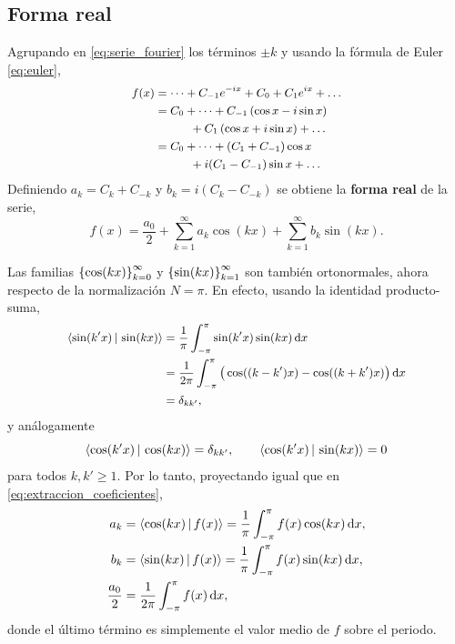 \subsection{Forma real}
\label{subsec:fourier_real}

Agrupando en \eqref{eq:serie_fourier} los t\'erminos $\pm k$ y usando la
f\'ormula de Euler \eqref{eq:euler},
\begin{equation}
  \label{eq:fourier_real_desarrollo}
  \small
  \begin{aligned}
    f(x)&=\dots+C_{-1}e^{-ix}+C_0+C_1e^{ix}+\dots\\
        &=C_0+\dots+C_{-1}\left( \cos x-i\sin x \right)\\
        &\qquad\quad+C_{1}\left( \cos x+i\sin x \right)+\dots\\
        &=C_0+\dots+(C_{1}+C_{-1})\cos x\\
        &\qquad\quad+i(C_{1}-C_{-1})\sin x+\dots
  \end{aligned}
\end{equation}
Definiendo $a_k=C_k+C_{-k}$ y $b_k=i(C_k-C_{-k})$ se obtiene la
\textbf{forma real} de la serie,
\begin{equation}
  \label{eq:fourier_real}
  f(x)=\frac{a_0}{2}+\sum_{k=1}^{\infty}a_k\cos(kx)
    +\sum_{k=1}^{\infty}b_k\sin(kx).
\end{equation}

Las familias $\left\{ \cos(kx) \right\}_{k=0}^{\infty}$ y
$\left\{ \sin(kx) \right\}_{k=1}^{\infty}$ son tambi\'en ortonormales, ahora respecto de
la normalizaci\'on $N=\pi$. En efecto, usando la identidad producto-suma,
\begin{equation}
  \label{eq:ortonormalidad_senos}
  \small
  \begin{aligned}
    \langle \sin(k'x) \,\vert\, \sin(kx) \rangle
      &=\frac{1}{\pi}\int_{-\pi}^{\pi}\sin(k'x)\sin(kx)\,\mathrm{d} x\\
      &=\frac{1}{2\pi}\int_{-\pi}^{\pi}
        \big(\cos((k-k')x)-\cos((k+k')x)\big)\,\mathrm{d} x\\
      &=\delta_{kk'},
  \end{aligned}
\end{equation}
y an\'alogamente
\begin{equation}
  \label{eq:ortonormalidad_cosenos}
  \langle \cos(k'x) \,\vert\, \cos(kx) \rangle=\delta_{kk'},
  \qquad
  \langle \cos(k'x) \,\vert\, \sin(kx) \rangle=0
\end{equation}
para todos $k,k'\ge 1$. Por lo tanto, proyectando igual que en
\eqref{eq:extraccion_coeficientes},
\begin{equation}
  \label{eq:coeficientes_reales}
  \begin{aligned}
    a_k&=\langle \cos(kx) \,\vert\, f(x) \rangle
        =\frac{1}{\pi}\int_{-\pi}^{\pi}f(x)\cos(kx)\,\mathrm{d} x,\\
    b_k&=\langle \sin(kx) \,\vert\, f(x) \rangle
        =\frac{1}{\pi}\int_{-\pi}^{\pi}f(x)\sin(kx)\,\mathrm{d} x,\\
    \frac{a_0}{2}&=\frac{1}{2\pi}\int_{-\pi}^{\pi}f(x)\,\mathrm{d} x ,
  \end{aligned}
\end{equation}
donde el \'ultimo t\'ermino es simplemente el valor medio de $f$ sobre el
periodo.
